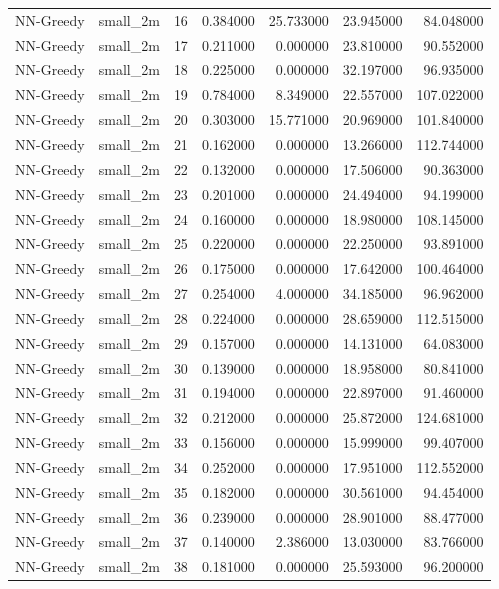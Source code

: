 \begin{tabular}{llrrrrr}
NN-Greedy & small_2m & 16 & 0.384000 & 25.733000 & 23.945000 & 84.048000 \\
NN-Greedy & small_2m & 17 & 0.211000 & 0.000000 & 23.810000 & 90.552000 \\
NN-Greedy & small_2m & 18 & 0.225000 & 0.000000 & 32.197000 & 96.935000 \\
NN-Greedy & small_2m & 19 & 0.784000 & 8.349000 & 22.557000 & 107.022000 \\
NN-Greedy & small_2m & 20 & 0.303000 & 15.771000 & 20.969000 & 101.840000 \\
NN-Greedy & small_2m & 21 & 0.162000 & 0.000000 & 13.266000 & 112.744000 \\
NN-Greedy & small_2m & 22 & 0.132000 & 0.000000 & 17.506000 & 90.363000 \\
NN-Greedy & small_2m & 23 & 0.201000 & 0.000000 & 24.494000 & 94.199000 \\
NN-Greedy & small_2m & 24 & 0.160000 & 0.000000 & 18.980000 & 108.145000 \\
NN-Greedy & small_2m & 25 & 0.220000 & 0.000000 & 22.250000 & 93.891000 \\
NN-Greedy & small_2m & 26 & 0.175000 & 0.000000 & 17.642000 & 100.464000 \\
NN-Greedy & small_2m & 27 & 0.254000 & 4.000000 & 34.185000 & 96.962000 \\
NN-Greedy & small_2m & 28 & 0.224000 & 0.000000 & 28.659000 & 112.515000 \\
NN-Greedy & small_2m & 29 & 0.157000 & 0.000000 & 14.131000 & 64.083000 \\
NN-Greedy & small_2m & 30 & 0.139000 & 0.000000 & 18.958000 & 80.841000 \\
NN-Greedy & small_2m & 31 & 0.194000 & 0.000000 & 22.897000 & 91.460000 \\
NN-Greedy & small_2m & 32 & 0.212000 & 0.000000 & 25.872000 & 124.681000 \\
NN-Greedy & small_2m & 33 & 0.156000 & 0.000000 & 15.999000 & 99.407000 \\
NN-Greedy & small_2m & 34 & 0.252000 & 0.000000 & 17.951000 & 112.552000 \\
NN-Greedy & small_2m & 35 & 0.182000 & 0.000000 & 30.561000 & 94.454000 \\
NN-Greedy & small_2m & 36 & 0.239000 & 0.000000 & 28.901000 & 88.477000 \\
NN-Greedy & small_2m & 37 & 0.140000 & 2.386000 & 13.030000 & 83.766000 \\
NN-Greedy & small_2m & 38 & 0.181000 & 0.000000 & 25.593000 & 96.200000 \\

\end{tabular}
